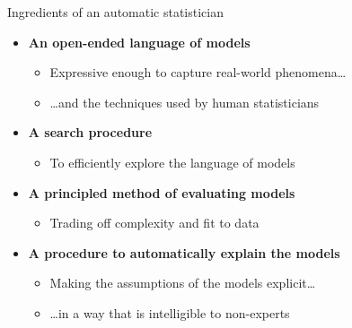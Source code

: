 \begin{frame}{Ingredients of an automatic statistician}
  \begin{itemize}
    \item {\bf An open-ended language of models}
    \begin{itemize}
       \item Expressive enough to capture real-world phenomena\ldots
       \item \ldots and the techniques used by human statisticians
     \end{itemize}
    \vspace{\baselineskip}
    \item {\bf A search procedure}
    \begin{itemize}
       \item To efficiently explore the language of models
     \end{itemize}
    \vspace{\baselineskip}
    \item {\bf A principled method of evaluating models}
    \begin{itemize}
       \item Trading off complexity and fit to data
     \end{itemize}
    \vspace{\baselineskip}
    \item {\bf A procedure to automatically explain the models}
    \begin{itemize}
       \item Making the assumptions of the models explicit\ldots
       \item \ldots in a way that is intelligible to non-experts
     \end{itemize}
  \end{itemize}
\end{frame}

